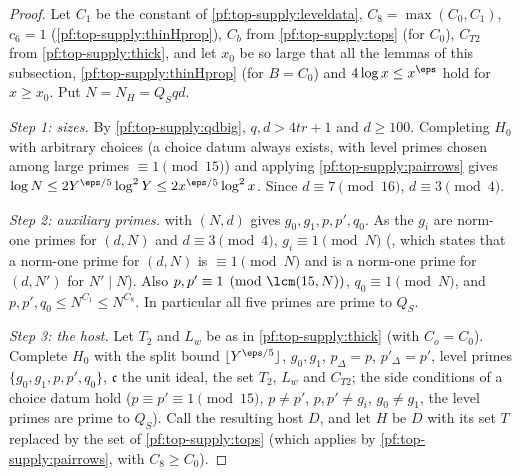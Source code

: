 \begin{proof}
Let $C_1$ be the constant of \cref{pf:top-supply:leveldata}, $C_8=\max(C_0,C_1)$, $c_6=1$ (\cref{pf:top-supply:thinHprop}),
$C_b$ from \cref{pf:top-supply:tops} (for $C_0$), $C_{T2}$ from \cref{pf:top-supply:thick}, and let $x_0$ be so large that
all the lemmas of this subsection, \cref{pf:top-supply:thinHprop} (for $B=C_0$) and $4\log x\le x^\eps$ hold for $x\ge x_0$.
Put $N=N_H=Q_Sqd$.

\emph{Step 1: sizes.} By \cref{pf:top-supply:qdbig}, $q,d>4tr+1$ and $d\ge100$. Completing $H_0$ with arbitrary choices
(a choice datum always exists, with level primes chosen among large primes $\equiv1\pmod{15}$) and applying
\cref{pf:top-supply:pairrows} gives $\log N\le2Y^{\eps/5}\log^2Y\le2x^{\eps/5}\log^2x$. Since $d\equiv7\pmod{16}$, $d\equiv3\pmod4$.

\emph{Step 2: auxiliary primes.}  with $(N,d)$ gives $g_0,g_1,p,p',q_0$. As the $g_i$ are
norm-one primes for $(d,N)$ and $d\equiv3\pmod4$, $g_i\equiv1\pmod N$ (,
which states that a norm-one prime for $(d,N)$ is $\equiv1\pmod N$ and is a norm-one prime for $(d,N')$ for $N'\mid N$). Also
$p,p'\equiv1\pmod{\lcm(15,N)}$, $q_0\equiv1\pmod N$, and $p,p',q_0\le N^{C_1}\le N^{C_8}$. In particular all five primes are
prime to $Q_S$.

\emph{Step 3: the host.} Let $T_2$ and $L_w$ be as in \cref{pf:top-supply:thick} (with $C_o=C_0$). Complete $H_0$ with the
split bound $\lfloor Y^{\eps/5}\rfloor$, $g_0,g_1$, $p_\Delta=p$, $p'_\Delta=p'$, level primes $\{g_0,g_1,p,p',q_0\}$,
$\mathfrak c$ the unit ideal, the set $T_2$, $L_w$ and $C_{T2}$; the side conditions of a choice datum hold
($p\equiv p'\equiv1\pmod{15}$, $p\ne p'$, $p,p'\ne g_i$, $g_0\ne g_1$, the level primes are prime to $Q_S$). Call the resulting
host $D$, and let $H$ be $D$ with its set $T$ replaced by the set of \cref{pf:top-supply:tops} (which applies by
\cref{pf:top-supply:pairrows}, with $C_8\ge C_0$).


\end{proof}
